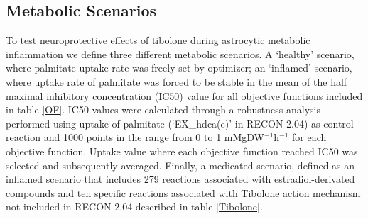 \subsection*{Metabolic Scenarios}
To test neuroprotective effects of tibolone during astrocytic metabolic inflammation we define three different metabolic scenarios. A `healthy' scenario, where palmitate uptake rate was freely set by optimizer; an `inflamed' scenario, where uptake rate of palmitate was forced to be stable in the mean of the half maximal inhibitory concentration (IC50) value for all objective functions included in table \ref{OF}. IC50 values were calculated through a robustness analysis performed using uptake of palmitate (`EX\_hdca(e)' in RECON 2.04) as control reaction and 1000 points in the range from 0 to 1 mMgDW$^{-1}$h$^{-1}$ for each objective function. Uptake value where each objective function reached IC50 was selected and subsequently averaged. Finally, a medicated scenario, defined as an inflamed scenario that includes 279 reactions associated with estradiol-derivated compounds and ten specific reactions associated with Tibolone action mechanism not included in RECON 2.04 described in table \ref{Tibolone}.

